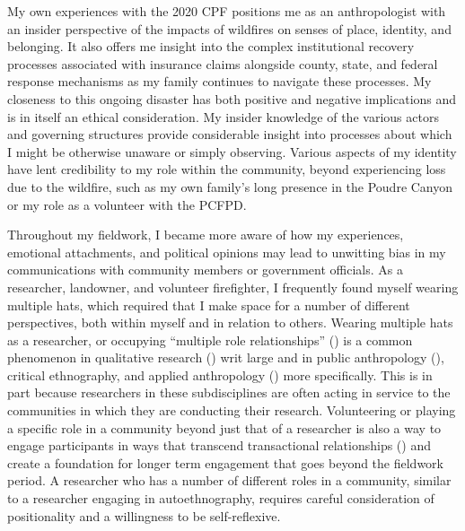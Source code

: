 \documentclass[
]{article}
\begin{document}
My own experiences with the 2020 CPF positions me as an anthropologist with an insider perspective of the impacts of wildfires on senses of place, identity, and belonging. It also offers me insight into the complex institutional recovery processes associated with insurance claims alongside county, state, and federal response mechanisms as my family continues to navigate these processes. My closeness to this ongoing disaster has both positive and negative implications and is in itself an ethical consideration. My insider knowledge of the various actors and governing structures provide considerable insight into processes about which I might be otherwise unaware or simply observing. Various aspects of my identity have lent credibility to my role within the community, beyond experiencing loss due to the wildfire, such as my own family's long presence in the Poudre Canyon or my role as a volunteer with the PCFPD.

Throughout my fieldwork, I became more aware of how my experiences, emotional attachments, and political opinions may lead to unwitting bias in my communications with community members or government officials. As a researcher, landowner, and volunteer firefighter, I frequently found myself wearing multiple hats, which required that I make space for a number of different perspectives, both within myself and in relation to others. Wearing multiple hats as a researcher, or occupying ``multiple role relationships'' () is a common phenomenon in qualitative research () writ large and in public anthropology (), critical ethnography, and applied anthropology () more specifically. This is in part because researchers in these subdisciplines are often acting in service to the communities in which they are conducting their research. Volunteering or playing a specific role in a community beyond just that of a researcher is also a way to engage participants in ways that transcend transactional relationships () and create a foundation for longer term engagement that goes beyond the fieldwork period. A researcher who has a number of different roles in a community, similar to a researcher engaging in autoethnography, requires careful consideration of positionality and a willingness to be self-reflexive.
\end{document}
